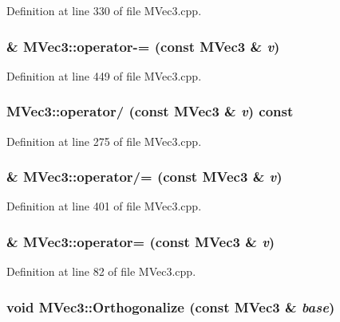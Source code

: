 Definition at line 330 of file MVec3.cpp.\hypertarget{class_m_vec3_f4ae4ae49dce1fc340d4f13ca714a360}{
\subsubsection[{operator-=}]{ \& MVec3::operator-= (const {\bf MVec3} \& {\em v})}}
\label{class_m_vec3_f4ae4ae49dce1fc340d4f13ca714a360}




Definition at line 449 of file MVec3.cpp.\hypertarget{class_m_vec3_173620909fa0bb83955665d1784f8861}{
\subsubsection[{operator/}]{ MVec3::operator/ (const {\bf MVec3} \& {\em v}) const}}
\label{class_m_vec3_173620909fa0bb83955665d1784f8861}




Definition at line 275 of file MVec3.cpp.\hypertarget{class_m_vec3_f60ff7a4c15b85de98d78cc47fc6f2ff}{
\subsubsection[{operator/=}]{ \& MVec3::operator/= (const {\bf MVec3} \& {\em v})}}
\label{class_m_vec3_f60ff7a4c15b85de98d78cc47fc6f2ff}




Definition at line 401 of file MVec3.cpp.\hypertarget{class_m_vec3_8d03c2d18357d0701f0f626d9db001cd}{
\subsubsection[{operator=}]{ \& MVec3::operator= (const {\bf MVec3} \& {\em v})}}
\label{class_m_vec3_8d03c2d18357d0701f0f626d9db001cd}




Definition at line 82 of file MVec3.cpp.\hypertarget{class_m_vec3_8aa706611d3bd87a40fbf85d51a459fd}{
\subsubsection[{Orthogonalize}]{\setlength{\rightskip}{0pt plus 5cm}void MVec3::Orthogonalize (const {\bf MVec3} \& {\em base})}}
\label{class_m_vec3_8aa706611d3bd87a40fbf85d51a459fd}




